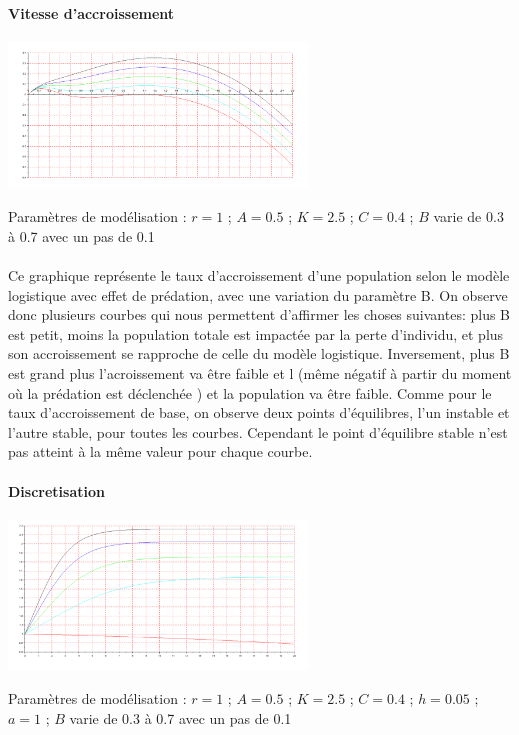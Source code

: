 \documentclass{article}
\begin{document}
\paragraph{Vitesse d'accroissement}
\begin{center}
\includegraphics[width=300px]{img/part2/LogB.png}
\end{center}
Paramètres de modélisation : $r=1$ ; $A=0.5$ ; $K=2.5$ ; $C=0.4$ ; $B$ varie de 0.3 à 0.7 avec un pas de 0.1
\paragraph{}
Ce graphique représente le taux d'accroissement d'une population selon le modèle logistique avec effet de prédation, avec une variation du paramètre B. On observe donc plusieurs courbes qui nous permettent d'affirmer les choses suivantes: plus B est petit, moins la population totale est impactée par la perte d'individu, et plus son accroissement se rapproche de celle du modèle logistique. Inversement, plus B est grand plus l'acroissement va être faible et l (même négatif à partir du moment où la prédation est déclenchée ) et la population va être faible.    Comme pour le taux d'accroissement de base, on observe deux points d'équilibres, l'un instable et l'autre stable, pour toutes les courbes. Cependant le point d'équilibre stable n'est pas atteint à la même valeur pour chaque courbe.

\paragraph{Discretisation}
\begin{center}
\includegraphics[width=300px]{img/part2/TrajB.png}
\end{center}
Paramètres de modélisation : $r=1$ ; $A=0.5$ ; $K=2.5$ ; $C=0.4$ ; $h=0.05$ ; $a=1$ ; $B$ varie de 0.3 à 0.7 avec un pas de 0.1
\end{document}
